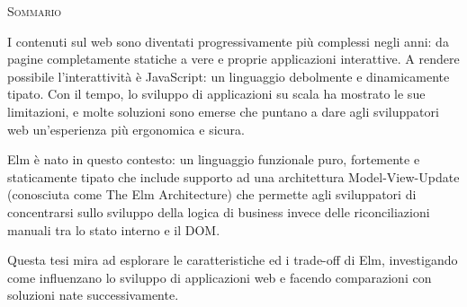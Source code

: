 \begin{center}
  \textsc{Sommario}
\end{center}
\noindent

I contenuti sul web sono diventati progressivamente più complessi negli anni: da pagine completamente statiche a vere e proprie applicazioni interattive. A rendere possibile l'interattività è JavaScript: un linguaggio debolmente e dinamicamente tipato. Con il tempo, lo sviluppo di applicazioni su scala ha mostrato le sue limitazioni, e molte soluzioni sono emerse che puntano a dare agli sviluppatori web un'esperienza più ergonomica e sicura.

Elm è nato in questo contesto: un linguaggio funzionale puro, fortemente e staticamente tipato che include supporto ad una architettura Model-View-Update (conosciuta come The Elm Architecture) che permette agli sviluppatori di concentrarsi sullo sviluppo della logica di business invece delle riconciliazioni manuali tra lo stato interno e il DOM.

Questa tesi mira ad esplorare le caratteristiche ed i trade-off di Elm, investigando come influenzano lo sviluppo di applicazioni web e facendo comparazioni con soluzioni nate successivamente.
